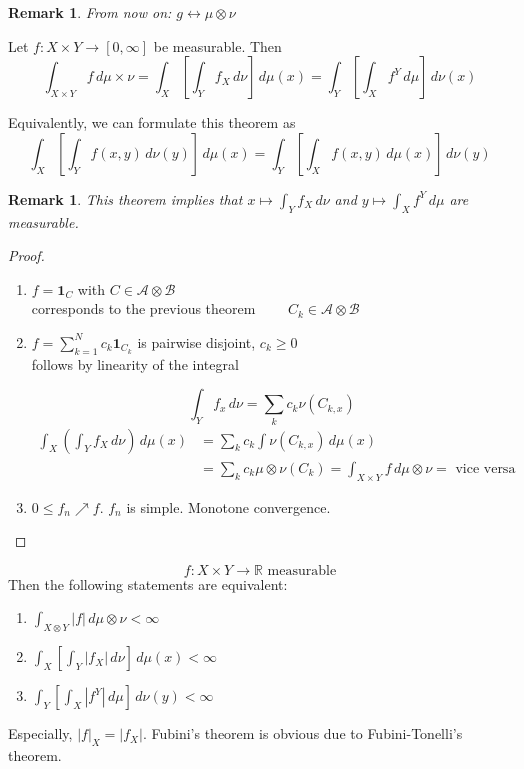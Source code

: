 \documentclass[a4paper]{article}
\newcounter{lecref}[section]
\numberwithin{lecref}{section}
\theoremstyle{break}
\newtheorem{remark}[lecref]{Remark}
\newtheorem*{Remark}{Remark}
\newcommand{\Abs}[1]{\left|#1\right|}
\begin{document}
\begin{Remark}
  From now on: $g \longleftrightarrow \mu \otimes \nu$
\end{Remark}

\begin{theorem}
  Let $f: X \times Y \to [0, \infty]$ be measurable. Then
  \[ \int_{X \times Y} f \, d\mu \times \nu = \int_X \left[\int_Y f_X \, d\nu\right] \, d\mu(x) = \int_Y \left[\int_X f^Y \, d\mu \right] \, d\nu(x) \]
\end{theorem}

Equivalently, we can formulate this theorem as
\[ \int_X \left[\int_Y f(x, y) \, d\nu(y)\right]\, d\mu(x) = \int_Y \left[\int_X f(x,y) \, d\mu(x)\right] \, d\nu(y) \]

\begin{remark}
  This theorem implies that $x \mapsto \int_Y f_X \, d\nu$ and $y \mapsto \int_X f^Y \, d\mu$ are measurable.
\end{remark}

\begin{proof}
  \begin{enumerate}
    \item $f = \mathbf{1}_C$ with $C \in \mathcal A \otimes \mathcal B$ \\
      corresponds to the previous theorem $\qquad C_k \in \mathcal A \otimes \mathcal B$
    \item $f = \sum_{k=1}^N c_k \mathbf{1}_{C_k}$ is pairwise disjoint, $c_k \geq 0$ \\
      follows by linearity of the integral

      \[ \int_Y f_x \, d\nu = \sum_k c_k \nu(C_{k,x}) \]
      \begin{align*}
        \int_X \left(\int_Y f_X \, d\nu\right) \, d\mu(x)
          &= \sum_k c_k \int \nu(C_{k,x}) \, d\mu(x) \\
          &= \sum_k c_k \mu \otimes \nu(C_k) = \int_{X \times Y} f \, d\mu \otimes \nu = \text{ vice versa}
      \end{align*}
    \item $0 \leq f_n \nearrow f$. $f_n$ is simple. Monotone convergence.
  \end{enumerate}
\end{proof}

\begin{theorem}[Fubini]
  \[ f: X \times Y \to \mathbb R \text{ measurable} \]
  Then the following statements are equivalent:
  \begin{enumerate}
    \item $\int_{X \otimes Y} \Abs{f} \, d\mu \otimes \nu < \infty$
    \item $\int_{X} \left[ \int_Y \Abs{f_X} \, d\nu \right] \, d\mu(x) < \infty$
    \item $\int_{Y} \left[ \int_{X} \Abs{f^Y} \, d\mu \right] \, d\nu(y) < \infty$
  \end{enumerate}
  Especially, $\Abs{f}_X = \Abs{f_X}$. Fubini's theorem is obvious due to Fubini-Tonelli's theorem.
\end{theorem}
\end{document}
